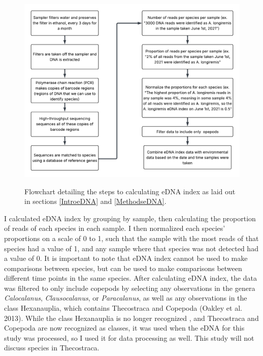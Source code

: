 \documentclass[12pt,twoside]{reedthesis}
\begin{document}
	\begin{figure}[!h]
		\begin{center}
			\includegraphics[scale=0.7]{Fig_MethodsFlowchart} \\
			\caption[Methods]{Flowchart detailing the steps to calculating eDNA index as laid out in sections \ref{IntroeDNA} and \ref{MethodseDNA}.} %
			\label{Flowchart}
		\end{center}
	\end{figure} 
	
	I calculated eDNA index by grouping by sample, then calculating the proportion of reads of each species in each sample. I then normalized each species' proportions on a scale of 0 to 1, such that the sample with the most reads of that species had a value of 1, and any sample where that species was not detected had a value of 0. It is important to note that eDNA index cannot be used to make comparisons between species, but can be used to make comparisons between different time points in the same species. After calculating eDNA index, the data was filtered to only include copepods by selecting any observations in the genera \textit{Calocalanus}, \textit{Clausocalanus}, or \textit{Paracalanus}, as well as any observations in the class Hexanauplia, which contains Thecostraca and Copepoda (Oakley et al. 2013). While the class Hexanauplia is no longer recognized \autocite{WoRMSWorldRegister, Lozano-Fernandez2019}, and Thecostraca and Copepoda are now recognized as classes, it was used when the eDNA for this study was processed, so I used it for data processing as well. This study will not discuss species in Thecostraca.
	
\end{document}

